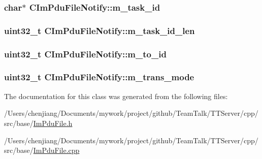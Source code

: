 \subsubsection[{m\+\_\+task\+\_\+id}]{\setlength{\rightskip}{0pt plus 5cm}char$\ast$ C\+Im\+Pdu\+File\+Notify\+::m\+\_\+task\+\_\+id\hspace{0.3cm}{\ttfamily [private]}}\label{class_c_im_pdu_file_notify_abf33446e7e73b6f6e84c4930376143e8}
\hypertarget{class_c_im_pdu_file_notify_abfea1044c0077b80ae495425674b8105}{}
\subsubsection[{m\+\_\+task\+\_\+id\+\_\+len}]{\setlength{\rightskip}{0pt plus 5cm}uint32\+\_\+t C\+Im\+Pdu\+File\+Notify\+::m\+\_\+task\+\_\+id\+\_\+len\hspace{0.3cm}{\ttfamily [private]}}\label{class_c_im_pdu_file_notify_abfea1044c0077b80ae495425674b8105}
\hypertarget{class_c_im_pdu_file_notify_ac650ce75ef4c5d8b3eaafc4a06ff2bd4}{}
\subsubsection[{m\+\_\+to\+\_\+id}]{\setlength{\rightskip}{0pt plus 5cm}uint32\+\_\+t C\+Im\+Pdu\+File\+Notify\+::m\+\_\+to\+\_\+id\hspace{0.3cm}{\ttfamily [private]}}\label{class_c_im_pdu_file_notify_ac650ce75ef4c5d8b3eaafc4a06ff2bd4}
\hypertarget{class_c_im_pdu_file_notify_a8af2f4ebba2469832e4b0b2e266891f4}{}
\subsubsection[{m\+\_\+trans\+\_\+mode}]{\setlength{\rightskip}{0pt plus 5cm}uint32\+\_\+t C\+Im\+Pdu\+File\+Notify\+::m\+\_\+trans\+\_\+mode\hspace{0.3cm}{\ttfamily [private]}}\label{class_c_im_pdu_file_notify_a8af2f4ebba2469832e4b0b2e266891f4}


The documentation for this class was generated from the following files\+:\begin{DoxyCompactItemize}
\item 
/\+Users/chenjiang/\+Documents/mywork/project/github/\+Team\+Talk/\+T\+T\+Server/cpp/src/base/\hyperlink{_im_pdu_file_8h}{Im\+Pdu\+File.\+h}\item 
/\+Users/chenjiang/\+Documents/mywork/project/github/\+Team\+Talk/\+T\+T\+Server/cpp/src/base/\hyperlink{_im_pdu_file_8cpp}{Im\+Pdu\+File.\+cpp}\end{DoxyCompactItemize}
